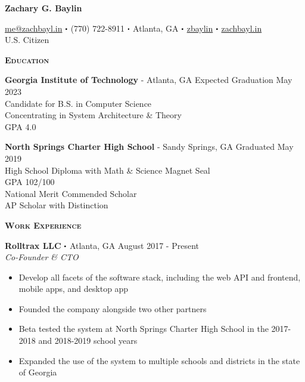 \documentclass{article}
\newcommand\sbullet[1][.5]{\mathbin{\vcenter{\hbox{\scalebox{#1}{$\bullet$}}}}}
\begin{document}
  \begin{center}
    {\LARGE \textbf{Zachary G. Baylin}}

    \href{mailto:me@zachbayl.in}{\faEnvelope \hspace{1pt} me@zachbayl.in} $\sbullet$ \faPhone \hspace{1pt} (770) 722-8911 $\sbullet$  Atlanta, GA $\sbullet$ \href{https://linkedin.com/in/zbaylin}{\faLinkedin \hspace{1pt} zbaylin} $\sbullet$ \href{http://zachbayl.in}{\faGlobeAmericas \hspace{1pt} zachbayl.in}\\
    U.S. Citizen
  \end{center}
  {\large \textbf{\textsc{Education}}}\hspace{5pt}\xrfill[.5ex]{.4pt}

  \vspace{3pt}

  \textbf{Georgia Institute of Technology} - Atlanta, GA \hspace*{\fill}Expected Graduation May 2023\\
  Candidate for B.S. in Computer Science\\
  Concentrating in System Architecture \& Theory\\
  GPA 4.0
  
  \vspace{5pt}

  \textbf{North Springs Charter High School} - Sandy Springs, GA \hspace*{\fill}Graduated May 2019\\
  High School Diploma with Math \& Science Magnet Seal\\
  GPA 102/100\\
  National Merit Commended Scholar\\
  AP Scholar with Distinction

  \vspace{10pt}

  {\large \textbf{\textsc{Work Experience}}}\hspace{5pt}\xrfill[.5ex]{.4pt}

  \vspace{3pt}

  \textbf{Rolltrax LLC} $\sbullet$ Atlanta, GA \hspace*{\fill} August 2017 - Present\\
  \textit{Co-Founder \& CTO}
  \begin{itemize}
    \item Develop all facets of the software stack, including the web API and frontend, mobile apps, and desktop app
    \item Founded the company alongside two other partners
    \item Beta tested the system at North Springs Charter High School in the 2017-2018 and 2018-2019 school years
    \item Expanded the use of the system to multiple schools and districts in the state of Georgia 
  \end{itemize}
\end{document}
